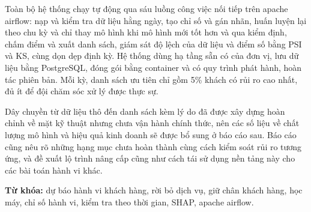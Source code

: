 Toàn bộ hệ thống chạy tự động qua sáu luồng công việc nối tiếp trên apache airflow: nạp và
kiểm tra dữ liệu hằng ngày, tạo chỉ số và gán nhãn, huấn luyện lại theo chu kỳ và chỉ thay mô
hình khi mô hình mới tốt hơn và qua kiểm định, chấm điểm và xuất danh sách, giám sát độ lệch
của dữ liệu và điểm số bằng PSI và KS, cùng dọn dẹp định kỳ. Hệ thống dùng hạ tầng sẵn có của
đơn vị, lưu dữ liệu bằng PostgreSQL, đóng gói bằng container và có quy trình phát hành, hoàn
tác phiên bản. Mỗi kỳ, danh sách ưu tiên chỉ gồm 5\% khách có rủi ro cao nhất, đủ ít để đội
chăm sóc xử lý được thực sự.

Dây chuyền từ dữ liệu thô đến danh sách kèm lý do đã được xây dựng hoàn chỉnh về mặt kỹ thuật
nhưng chưa vận hành chính thức, nên các số liệu về chất lượng mô hình và hiệu quả kinh doanh
sẽ được bổ sung ở báo cáo sau.
Báo cáo cũng nêu rõ những hạng mục chưa hoàn thành cùng cách kiểm soát rủi ro tương ứng, và đề xuất lộ
trình nâng cấp cũng như cách tái sử dụng nền tảng này cho các bài toán hành vi khác.

\vspace{0.4cm}
\noindent\textbf{Từ khóa:} dự báo hành vi khách hàng, rời bỏ dịch vụ, giữ chân khách
hàng, học máy, chỉ số hành vi, kiểm tra theo thời gian, SHAP, apache airflow.


